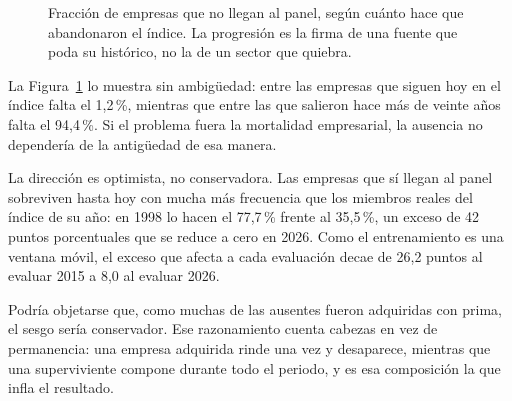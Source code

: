 \begin{figure}[htbp]
  \centering
  \caption{Fracción de empresas que no llegan al panel, según cuánto hace que abandonaron el índice.
  La progresión es la firma de una fuente que poda su histórico, no la de un sector que quiebra.}
  \label{fig:ausencia-antiguedad}
\end{figure}

La Figura~\ref{fig:ausencia-antiguedad} lo muestra sin ambigüedad: entre las empresas que siguen hoy
en el índice falta el 1,2\,\%, mientras que entre las que salieron hace más de veinte años falta el
94,4\,\%. Si el problema fuera la mortalidad empresarial, la ausencia no dependería de la
antigüedad de esa manera.

La dirección es optimista, no conservadora. Las empresas que sí llegan al panel sobreviven
hasta hoy con mucha más frecuencia que los miembros reales del índice de su año: en 1998 lo hacen el
77,7\,\% frente al 35,5\,\%, un exceso de 42 puntos porcentuales que se reduce a cero en 2026. Como
el entrenamiento es una ventana móvil, el exceso que afecta a cada evaluación decae de 26,2 puntos
al evaluar 2015 a 8,0 al evaluar 2026.

Podría objetarse que, como muchas de las ausentes fueron adquiridas con prima, el sesgo sería
conservador. Ese razonamiento cuenta cabezas en vez de permanencia: una empresa adquirida rinde una
vez y desaparece, mientras que una superviviente compone durante todo el periodo, y es esa
composición la que infla el resultado.

